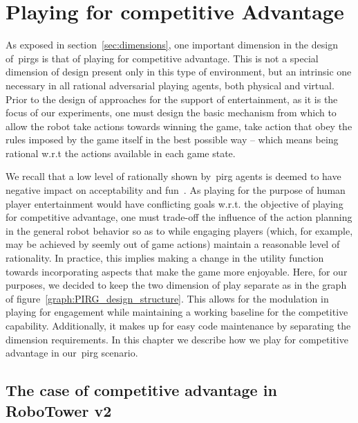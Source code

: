 \chapter{Playing for competitive Advantage}

As exposed in section~\ref{sec:dimensions}, one important dimension in the design of~\gls{pirg}s is that of playing for competitive advantage. This is not a special dimension of design present only in this type of environment, but an intrinsic one necessary in all rational adversarial playing agents, both physical and virtual. Prior to the design of approaches for the support of entertainment, as it is the focus of our experiments, one must design the basic mechanism from which to allow the robot take actions towards winning the game, \ie take action that obey the rules imposed by the game itself in the best possible way -- which means being rational w.r.t the actions available in each game state. 

We recall that a low level of rationally shown by~\gls{pirg} agents is deemed to have negative impact on acceptability and fun~\citep{martinoia_physically_2013}. As playing for the purpose of human player entertainment would have conflicting goals w.r.t. the objective of playing for competitive advantage, one must trade-off the influence of the action planning in the general robot behavior so as to while engaging players (which, for example, may be achieved by seemly out of game actions) maintain a reasonable level of rationality. In practice, this implies making a change in the utility function towards incorporating aspects that make the game more enjoyable. Here, for our purposes, we decided to keep the two dimension of play separate as in the graph of figure~\ref{graph:PIRG_design_structure}. This allows for the modulation in playing for engagement while maintaining a working baseline for the competitive capability. Additionally, it makes up for easy code maintenance by separating the dimension requirements.  In this chapter we describe how we play for competitive advantage in our~\gls{pirg} scenario.

\section{The case of competitive advantage in RoboTower v2}

